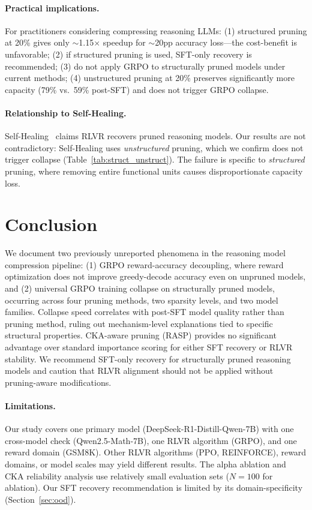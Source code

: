 \documentclass[11pt,a4paper]{article}
\begin{document}
\paragraph{Practical implications.}
For practitioners considering compressing reasoning LLMs: (1) structured pruning at 20\% gives only $\sim$1.15$\times$ speedup for $\sim$20pp accuracy loss---the cost-benefit is unfavorable; (2) if structured pruning is used, SFT-only recovery is recommended; (3) do not apply GRPO to structurally pruned models under current methods; (4) unstructured pruning at 20\% preserves significantly more capacity (79\% vs.\ 59\% post-SFT) and does not trigger GRPO collapse.

\paragraph{Relationship to Self-Healing.}
Self-Healing~\cite{selfhealing2025} claims RLVR recovers pruned reasoning models. Our results are not contradictory: Self-Healing uses \emph{unstructured} pruning, which we confirm does not trigger collapse (Table~\ref{tab:struct_unstruct}). The failure is specific to \emph{structured} pruning, where removing entire functional units causes disproportionate capacity loss.

\section{Conclusion}
\label{sec:conclusion}

We document two previously unreported phenomena in the reasoning model compression pipeline: (1) GRPO reward-accuracy decoupling, where reward optimization does not improve greedy-decode accuracy even on unpruned models, and (2) universal GRPO training collapse on structurally pruned models, occurring across four pruning methods, two sparsity levels, and two model families. Collapse speed correlates with post-SFT model quality rather than pruning method, ruling out mechanism-level explanations tied to specific structural properties. CKA-aware pruning (RASP) provides no significant advantage over standard importance scoring for either SFT recovery or RLVR stability. We recommend SFT-only recovery for structurally pruned reasoning models and caution that RLVR alignment should not be applied without pruning-aware modifications.

\paragraph{Limitations.}
Our study covers one primary model (DeepSeek-R1-Distill-Qwen-7B) with one cross-model check (Qwen2.5-Math-7B), one RLVR algorithm (GRPO), and one reward domain (GSM8K). Other RLVR algorithms (PPO, REINFORCE), reward domains, or model scales may yield different results. The alpha ablation and CKA reliability analysis use relatively small evaluation sets ($N=100$ for ablation). Our SFT recovery recommendation is limited by its domain-specificity (Section~\ref{sec:ood}).
\end{document}
